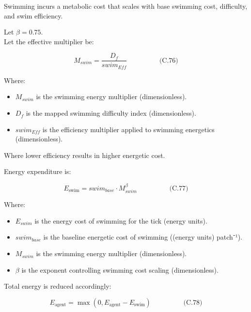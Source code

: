 \documentclass[
]{book}
\providecommand{\tightlist}{%
  \setlength{\itemsep}{0pt}\setlength{\parskip}{0pt}}
\begin{document}
Swimming incurs a metabolic cost that scales with base swimming cost,
difficulty, and swim efficiency.

Let \(\beta = 0.75\).\\
Let the effective multiplier be:

\[
\begin{equation} M_{swim} = \frac{D_f}{swim_{Eff}}  \hspace{2cm} \text{(C.76)} \end{equation}
\]

Where:

\begin{itemize}
\tightlist
\item
  \(M_{swim}\) is the swimming energy multiplier (dimensionless).
\item
  \(D_f\) is the mapped swimming difficulty index (dimensionless).
\item
  \(swim_{Eff}\) is the efficiency multiplier applied to swimming
  energetics (dimensionless).
\end{itemize}

Where lower efficiency results in higher energetic cost.

Energy expenditure is:

\[
\begin{equation} E_{\text{swim}} = swim_{base} \cdot M_{swim}^\beta  \hspace{2cm} \text{(C.77)} \end{equation}
\]

Where:

\begin{itemize}
\tightlist
\item
  \(E_{swim}\) is the energy cost of swimming for the tick (energy
  units).
\item
  \(swim_{base}\) is the baseline energetic cost of swimming ((energy
  units) patch⁻¹).
\item
  \(M_{swim}\) is the swimming energy multiplier (dimensionless).
\item
  \(\beta\) is the exponent controlling swimming cost scaling
  (dimensionless).
\end{itemize}

Total energy is reduced accordingly:

\[
\begin{equation} E_{\text{agent}} = \max(0, E_{\text{agent}} - E_{\text{swim}})  \hspace{2cm} \text{(C.78)} \end{equation}
\]
\end{document}
